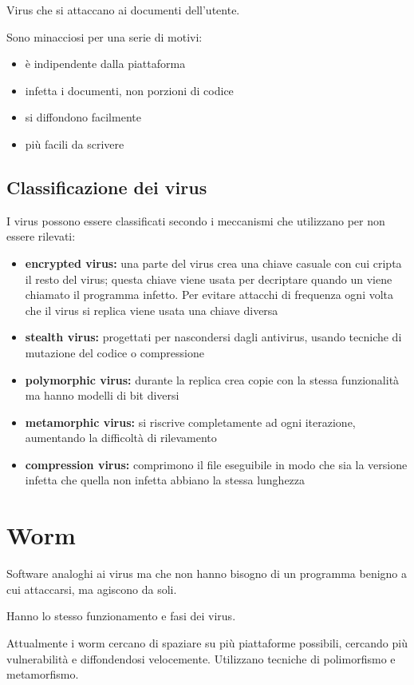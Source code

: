 Virus che si attaccano ai documenti dell'utente.

Sono minacciosi per una serie di motivi:
\begin{itemize}
    \item è indipendente dalla piattaforma
    \item infetta i documenti, non porzioni di codice
    \item si diffondono facilmente
    \item più facili da scrivere
\end{itemize}

\subsection{Classificazione dei virus}
I virus possono essere classificati secondo i meccanismi che utilizzano per 
non essere rilevati:
\begin{itemize}
    \item \textbf{encrypted virus:} una parte del virus crea una chiave casuale con cui cripta il resto del virus; questa chiave viene
    usata per decriptare quando un viene chiamato il programma infetto. Per evitare attacchi di frequenza ogni volta che il virus 
    si replica viene usata una chiave diversa
    \item \textbf{stealth virus:} progettati per nascondersi dagli antivirus, usando tecniche di mutazione del codice o compressione
    \item \textbf{polymorphic virus:} durante la replica crea copie con la stessa funzionalità ma hanno modelli di bit diversi 
    \item \textbf{metamorphic virus:} si riscrive completamente ad ogni iterazione, aumentando la difficoltà di rilevamento
    \item \textbf{compression virus:} comprimono il file eseguibile in modo che sia la versione infetta che quella non infetta abbiano la stessa lunghezza
\end{itemize}

\section{Worm}

Software analoghi ai virus ma che non hanno bisogno di un programma benigno a cui attaccarsi, ma agiscono da soli.

Hanno lo stesso funzionamento e fasi dei virus.

Attualmente i worm cercano di spaziare su più piattaforme possibili, cercando più vulnerabilità
e diffondendosi velocemente. Utilizzano tecniche di polimorfismo e metamorfismo.

